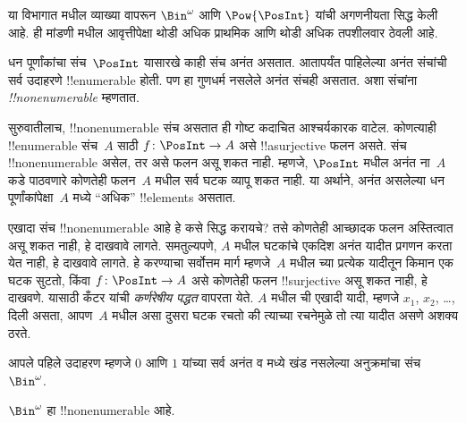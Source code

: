 \documentclass[../../../include/open-logic-section]{subfiles}
\begin{document}


\begin{editorial}
  या विभागात  मधील व्याख्या वापरून $\Bin^\omega$ आणि
  $\Pow{\PosInt}$ यांची अगणनीयता सिद्ध केली आहे. ही मांडणी
   मधील आवृत्तीपेक्षा थोडी अधिक प्राथमिक आणि
  थोडी अधिक तपशीलवार ठेवली आहे.
\end{editorial}

धन पूर्णांकांचा संच~$\PosInt$ यासारखे काही संच अनंत असतात. आतापर्यंत
पाहिलेल्या अनंत संचांची सर्व उदाहरणे !!{enumerable} होती. पण हा गुणधर्म
नसलेले अनंत संचही असतात. अशा संचांना \emph{!!{nonenumerable}} म्हणतात.

सुरुवातीलाच, !!{nonenumerable} संच असतात ही गोष्ट कदाचित आश्चर्यकारक
वाटेल. कोणत्याही !!{enumerable} संच~$A$ साठी $f \colon \PosInt \to A$
असे !!a{surjective} फलन असते. संच !!{nonenumerable} असेल, तर असे फलन
असू शकत नाही. म्हणजे, $\PosInt$ मधील अनंत ना~$A$ कडे
पाठवणारे कोणतेही फलन~$A$ मधील सर्व घटक व्यापू शकत नाही. या अर्थाने,
अनंत असलेल्या धन पूर्णांकांपेक्षा~$A$ मध्ये ``अधिक'' !!{element}s असतात.

एखादा संच !!{nonenumerable} आहे हे कसे सिद्ध करायचे? तसे कोणतेही
आच्छादक फलन अस्तित्वात असू शकत नाही, हे दाखवावे लागते. समतुल्यपणे,
$A$ मधील घटकांचे एकदिश अनंत यादीत प्रगणन करता येत नाही, हे दाखवावे
लागते. हे करण्याचा सर्वोत्तम मार्ग म्हणजे~$A$ मधील च्या
प्रत्येक यादीतून किमान एक घटक सुटतो, किंवा $f\colon \PosInt \to A$
असे कोणतेही फलन !!{surjective} असू शकत नाही, हे दाखवणे. यासाठी कँटर
यांची \emph{कर्णरेषीय पद्धत} वापरता येते. $A$ मधील ची
एखादी यादी, म्हणजे $x_1$, $x_2$, \dots, दिली असता, आपण~$A$ मधील असा
दुसरा घटक रचतो की त्याच्या रचनेमुळे तो त्या यादीत असणे अशक्य ठरते.

आपले पहिले उदाहरण म्हणजे $0$ आणि $1$ यांच्या सर्व अनंत व मध्ये खंड
नसलेल्या अनुक्रमांचा संच~$\Bin^\omega$.

\begin{thm}
$\Bin^\omega$ हा !!{nonenumerable} आहे.
\end{thm}
\end{document}
